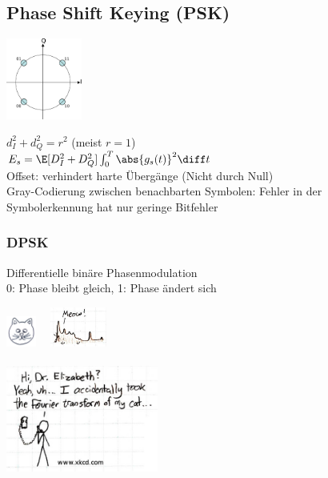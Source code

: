 \documentclass[fs, footer]{latex4ei}
\begin{document}
\begin{multicols*}{4}
{	\subsection{Phase Shift Keying (PSK)}
	\parbox{2.5cm}{
	\includegraphics[width = 2.5cm]{./img/QPSK.pdf}
	} \quad 
	\parbox{4cm}{ $d_I^2 + d_Q^2 = r^2$ \qquad (meist $r = 1$) \\ $E_s = \E[D_I^2 + D_Q^2] \int_0^T \abs{g_s(t)}^2 \diff t$ \\

	Offset: verhindert harte Übergänge (Nicht durch Null)\\
	Gray-Codierung zwischen benachbarten Symbolen: Fehler in der Symbolerkennung hat nur geringe Bitfehler\\	
	}
		\subsubsection{DPSK}
		Differentielle binäre Phasenmodulation\\
		0: Phase bleibt gleich, 1: Phase ändert sich\\


}




\columnbreak

 \qquad \includegraphics[height = 1cm]{./img/cat.jpg} \ \raisebox{0.5cm}{$\FT$}\ \includegraphics[height = 1.3cm]{./img/cat_f.jpg}\\
\\
\includegraphics[width = 5cm]{./img/xkcd2.jpg}


\end{multicols*}
\end{document}
